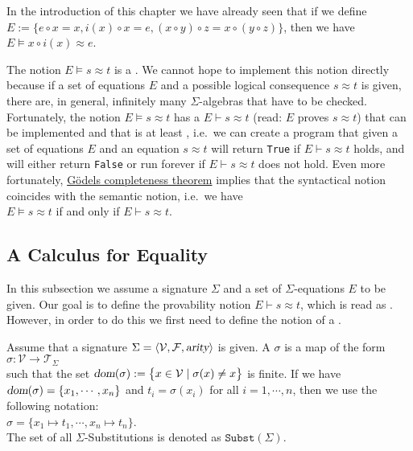 \example
In the introduction of this chapter we have already seen that if we define
$E := \bigl\{ e \circ x = x, i(x) \circ x = e, (x \circ y) \circ z = x \circ (y \circ z) \bigr\}$,
then we have
\\[0.2cm]
\hspace*{1.3cm}
$E \models x \circ i(x) \approx e$.  \eox

The notion $E \models s \approx t$ is a .  We cannot hope to implement this notion directly
because if a set of equations $E$ and a possible logical consequence $s \approx t$ is given, there are, in
general, infinitely many $\Sigma$-algebras that have to be checked.  Fortunately, the notion 
$E \models s \approx t$ has a  $E \vdash s \approx t$ (read: $E$ proves $s \approx t$)
that can be implemented and that is at least , i.e.~we can create a program that given 
a set of equations $E$ and an equation $s \approx t$ will return \texttt{True} if $E \vdash s \approx t$ holds, and will
either return \texttt{False} or run forever if $E \vdash s \approx t$ does not hold.  Even more fortunately,
\href{https://en.wikipedia.org/wiki/G%C3%B6del%27s_completeness_theorem}{G\"{o}dels completeness theorem} 
implies that the syntactical notion coincides with the semantic notion, i.e.~we have
\\[0.2cm]
\hspace*{1.3cm}
$E \models s \approx t$ \quad if and only if \quad $E \vdash s \approx t$.

\subsection{A Calculus for Equality}
In this subsection we assume a signature $\Sigma$ and a set of $\Sigma$-equations $E$ to be given.  
Our goal is to define the provability notion $E \vdash s \approx t$, which is read as .
However, in order to do this we first need to define 
the notion of a .

\begin{Definition}
  Assume that a signature $\Sigma = \langle \mathcal{V}, \mathcal{F}, \textsl{arity} \rangle$ is given.
  A  $\sigma$ is a map of the form
  \\[0.2cm]
  \hspace*{1.3cm}
  $\sigma: \mathcal{V} \rightarrow \mathcal{T}_\Sigma$ 
  \\[0.2cm]
  such that the set $\textsl{dom}(\sigma) := \bigl\{ x \in \mathcal{V} \mid \sigma(x) \not= x \bigr\}$ is finite.
  If we have $\textsl{dom}(\sigma) = \{ x_1, \cdots, x_n \}$ and $t_i = \sigma(x_i)$ for all $i = 1, \cdots, n$,
  then we use the following notation:
  \\[0.2cm]
  \hspace*{1.3cm}
  $\sigma = \{ x_1 \mapsto t_1, \cdots, x_n \mapsto t_n \}$.
  \\[0.2cm]
  The set of all $\Sigma$-Substitutions is denoted as $\mathtt{Subst}(\Sigma)$.
  \eoxs
\end{Definition}

